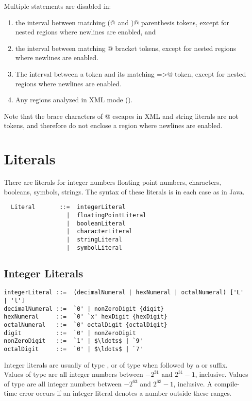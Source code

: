 Multiple statements are disabled in:
\begin{enumerate}
\item
the interval between matching \lstinline@(@ and \lstinline@)@ parenthesis tokens, except for nested regions where newlines are enabled, and
\item
the interval between matching @ bracket tokens,
except for nested regions where newlines are enabled.
\item
The interval between a \lstinline@case@ token and its matching
\lstinline@=>@ token, except for nested regions where newlines are
enabled.
\item Any regions analyzed in XML mode ().
\end{enumerate}
Note that the brace characters of @ escapes in XML and string literals are not tokens, and therefore do not enclose a region where newlines
are enabled.

\section{Literals}\label{sec:literals}

There are literals for integer numbers floating point numbers,
characters, booleans, symbols, strings.  The syntax of these literals is in
each case as in Java.


\syntax\begin{lstlisting}
  Literal       ::=  integerLiteral
                  |  floatingPointLiteral
                  |  booleanLiteral
                  |  characterLiteral
                  |  stringLiteral
                  |  symbolLiteral
\end{lstlisting}

\subsection{Integer Literals}

\syntax\begin{lstlisting}
integerLiteral ::=  (decimalNumeral | hexNumeral | octalNumeral) ['L' | 'l']
decimalNumeral ::=  `0' | nonZeroDigit {digit}
hexNumeral     ::=  `0' `x' hexDigit {hexDigit}
octalNumeral   ::=  `0' octalDigit {octalDigit}
digit          ::=  `0' | nonZeroDigit
nonZeroDigit   ::=  `1' | $\ldots$ | `9'
octalDigit     ::=  `0' | $\ldots$ | `7'
\end{lstlisting}
Integer literals are usually of type \lstinline@int@, or of type
\lstinline@long@ when followed by a \lstinline@L@ or
\lstinline@l@ suffix. Values of type \lstinline@int@ are all integer
numbers between $-2^{31}$ and $2^{31}-1$, inclusive.  Values of
type \lstinline@long@ are all integer numbers between $-2^{63}$ and
$2^{63}-1$, inclusive. A compile-time error occurs if an integer literal
denotes a number outside these ranges.


